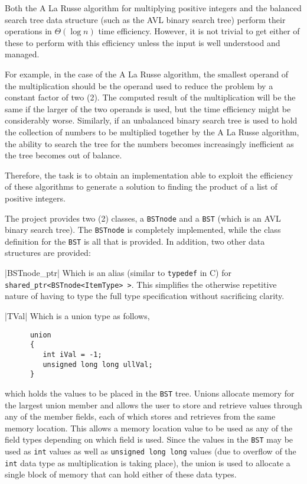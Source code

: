\documentclass[10pt]{article}
\newcommand{\Vitem}{%
   \SaveVerb[aftersave={%
      \item[\UseVerb{Vitem}]}]{Vitem}}
\begin{document}
Both the A La Russe algorithm for multiplying positive integers and the balanced search tree data structure (such as the AVL binary search tree) perform their operations in $\Theta(\log n)$ time efficiency. However, it is not trivial to get either of these to perform with this efficiency unless the input is well understood and managed.

For example, in the case of the A La Russe algorithm, the smallest operand of the multiplication should be the operand used to reduce the problem by a constant factor of two (2). The computed result of the multiplication will be the same if the larger of the two operands is used, but the time efficiency might be considerably worse. Similarly, if an unbalanced binary search tree is used to hold the collection of numbers to be multiplied together by the A La Russe algorithm, the ability to search the tree for the numbers becomes increasingly inefficient as the tree becomes out of balance.

Therefore, the task is to obtain an implementation able to exploit the efficiency of these algorithms to generate a solution to finding the product of a list of positive integers.

The project provides two (2) classes, a \verb|BSTnode| and a \verb|BST| (which is an AVL binary search tree). The \verb|BSTnode| is completely implemented, while the class definition for the \verb|BST| is all that is provided. In addition, two other data structures are provided:
\begin{description}
   \Vitem|BSTnode_ptr| Which is an alias (similar to \verb|typedef| in C) for \verb|shared_ptr<BSTnode<ItemType> >|. This simplifies the otherwise repetitive nature of having to type the full type specification without sacrificing clarity. 

   \Vitem|TVal| Which is a union type as follows,
   \begin{Verbatim}
      union 
      {
         int iVal = -1;
         unsigned long long ullVal;
      }
   \end{Verbatim}
   which holds the values to be placed in the \verb|BST| tree. Unions allocate memory for the largest union member and allows the user to store and retrieve values through any of the member fields, each of which stores and retrieves from the same memory location. This allows a memory location value to be used as any of the field types depending on which field is used. Since the values in the \verb|BST| may be used as \verb|int| values as well as \verb|unsigned long long| values (due to overflow of the \verb|int| data type as multiplication is taking place), the union is used to allocate a single block of memory that can hold either of these data types. 
\end{description}
\end{document}
